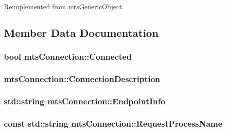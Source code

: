 Reimplemented from \hyperlink{classmts_generic_object_a2030aaa58bc215eccce1dc8d20dd0fdc}{mts\-Generic\-Object}.



\subsection{Member Data Documentation}
\hypertarget{classmts_connection_a2384cf6081cf01b9330bf6810108c2b5}{
\subsubsection[{Connected}]{\setlength{\rightskip}{0pt plus 5cm}bool mts\-Connection\-::\-Connected\hspace{0.3cm}{\ttfamily [protected]}}}\label{classmts_connection_a2384cf6081cf01b9330bf6810108c2b5}
\hypertarget{classmts_connection_a0a529fcb9c6627e79c49eb05265dd43e}{
\subsubsection[{Connection\-Description}]{ mts\-Connection\-::\-Connection\-Description\hspace{0.3cm}{\ttfamily [protected]}}}\label{classmts_connection_a0a529fcb9c6627e79c49eb05265dd43e}
\hypertarget{classmts_connection_ad5e701a7d4fe0a27b084d0f8d161c7d6}{
\subsubsection[{Endpoint\-Info}]{\setlength{\rightskip}{0pt plus 5cm}std\-::string mts\-Connection\-::\-Endpoint\-Info\hspace{0.3cm}{\ttfamily [protected]}}}\label{classmts_connection_ad5e701a7d4fe0a27b084d0f8d161c7d6}
\hypertarget{classmts_connection_a81c4b5147db8f46d70b30c7fabbc72c8}{
\subsubsection[{Request\-Process\-Name}]{\setlength{\rightskip}{0pt plus 5cm}const std\-::string mts\-Connection\-::\-Request\-Process\-Name\hspace{0.3cm}{\ttfamily [protected]}}}\label{classmts_connection_a81c4b5147db8f46d70b30c7fabbc72c8}
